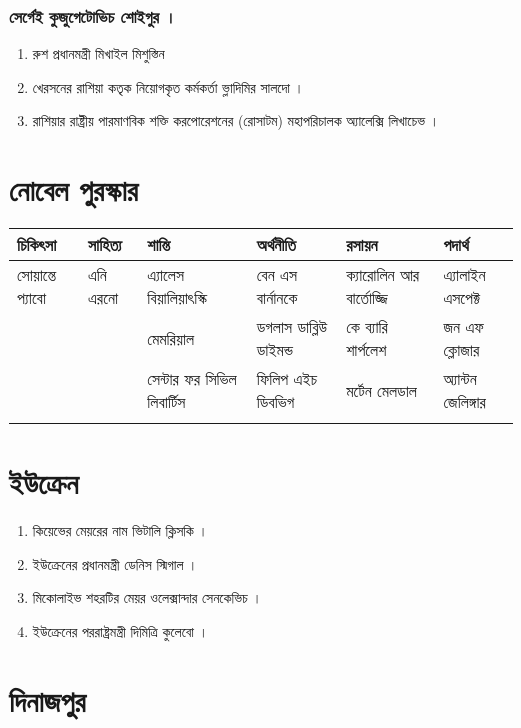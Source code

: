 \documentclass[11pt]{article}
\begin{document}
\subsubsection{সের্গেই কুজুগেটোভিচ শোইগুর ।}
\label{sec:orgbcb6406}
\begin{enumerate}
\item রুশ প্রধানমন্ত্রী মিখাইল মিশুস্তিন
\item খেরসনের রাশিয়া কতৃক নিয়োগকৃত কর্মকর্তা ভ্লাদিমির সালদো ।
\item রাশিয়ার রাষ্ট্রীয় পারমাণবিক শক্তি করপোরেশনের (রোসাটম) মহাপরিচালক অ্যালেক্সি লিখাচেভ ।
\end{enumerate}


\section{নোবেল পুরস্কার}
\label{sec:org7099dfc}

\begin{center}
\begin{tabular}{llllll}
চিকিৎসা & সাহিত্য & শান্তি & অর্থনীতি & রসায়ন & পদার্থ\\
\hline
সোয়ান্তে প্যাবো & এনি এরনো & এ্যালেস বিয়ালিয়াৎস্কি & বেন এস বার্নানকে & ক্যারোলিন আর বার্তোজ্জি & এ্যালাইন এসপেক্ট\\
\hline
 &  & মেমরিয়াল & ডগলাস ডাব্লিউ ডাইমন্ড & কে ব্যারি শার্পলেশ & জন এফ ক্লোজার\\
\hline
 &  & সেন্টার ফর সিভিল লিবার্টিস & ফিলিপ এইচ ডিবভিগ & মর্টেন মেলডাল & অ্যান্টন জেলিঙ্গার\\
 &  &  &  &  & \\
\hline
\end{tabular}
\end{center}

\section{ইউক্রেন}
\label{sec:org6c90635}
\begin{enumerate}
\item কিয়েভের মেয়রের নাম  ভিটালি ক্লিসকি ।
\item ইউক্রেনের প্রধানমন্ত্রী ডেনিস স্মিগাল ।
\item মিকোলাইভ শহরটির মেয়র ওলেক্সান্দার সেনকেভিচ ।
\item ইউক্রেনের পররাষ্ট্রমন্ত্রী দিমিত্রি কুলেবো ।
\end{enumerate}

\section{দিনাজপুর}
\label{sec:org59a5742}
\end{document}
